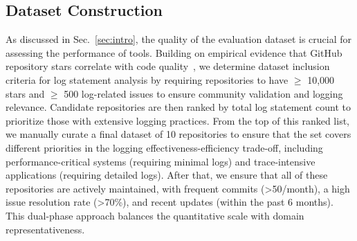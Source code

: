\subsection{Dataset Construction}
\label{sec:method:static_dataset_building} 
As discussed in Sec.~\ref{sec:intro}, the quality of the evaluation dataset is crucial for assessing the performance of tools. 
Building on empirical evidence that GitHub repository stars correlate with code quality~\cite{Jiang2024ASO}, we determine dataset inclusion criteria for log statement analysis by requiring repositories to have $\geq$ 10,000 stars and $\geq$ 500 log-related issues to ensure community validation and logging relevance. Candidate repositories are then ranked by total log statement count to prioritize those with extensive logging practices.
From the top of this ranked list, we manually curate a final dataset of 10 repositories to ensure that the set covers different priorities in the logging effectiveness-efficiency trade-off, including performance-critical systems (requiring minimal logs) and trace-intensive applications (requiring detailed logs). After that, we ensure that all of these repositories are actively maintained, with frequent commits (>50/month), a high issue resolution rate (>70\%), and recent updates (within the past 6 months). This dual-phase approach balances the quantitative scale with domain representativeness.


